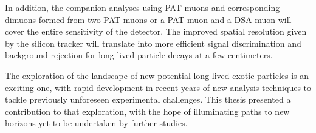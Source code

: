 In addition, the companion analyses using PAT muons and corresponding dimuons formed from two PAT muons or a PAT muon and a DSA muon will cover the entire sensitivity of the detector.
The improved spatial resolution given by the silicon tracker will translate into more efficient signal discrimination and background rejection for long-lived particle decays at a few centimeters.

The exploration of the landscape of new potential long-lived exotic particles is an exciting one, with rapid development in recent years of new analysis techniques to tackle previously unforeseen experimental challenges.
This thesis presented a contribution to that exploration, with the hope of illuminating paths to new horizons yet to be undertaken by further studies.
